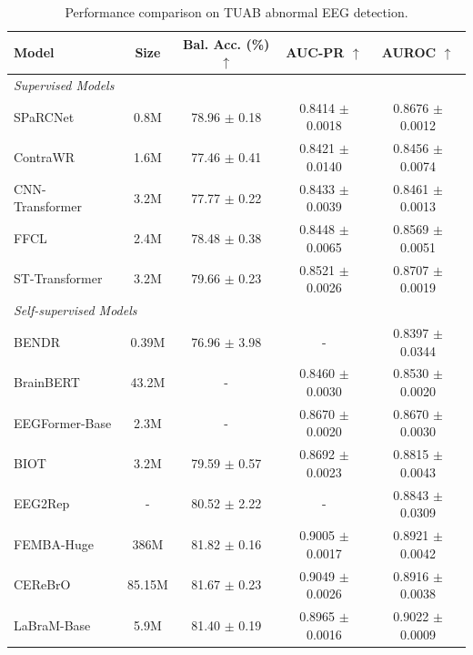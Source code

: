 \begin{table}[htbp!]
    \centering
    \caption{Performance comparison on TUAB abnormal EEG detection.}
    \label{tab:results_tuab}
    
    \setlength{\tabcolsep}{6pt} %
    \small
    \begin{tabular}{@{}lcccc@{}}
        \toprule
        \textbf{Model} & \textbf{Size} & \textbf{Bal. Acc. (\%)} $\uparrow$ & \textbf{AUC-PR} $\uparrow$ & \textbf{AUROC} $\uparrow$ \\
        \midrule
        \multicolumn{5}{l}{\textit{Supervised Models}} \\    SPaRCNet~\cite{jing2023development} & 0.8M & 78.96 $\pm$ 0.18 & 0.8414 $\pm$ 0.0018 & 0.8676 $\pm$ 0.0012 \\
        ContraWR~\cite{yang2021self} & 1.6M & 77.46 $\pm$ 0.41 & 0.8421 $\pm$ 0.0140 & 0.8456 $\pm$ 0.0074 \\
        CNN-Transformer~\cite{peh2022transformer} & 3.2M & 77.77 $\pm$ 0.22 & 0.8433 $\pm$ 0.0039 & 0.8461 $\pm$ 0.0013 \\
        FFCL~\cite{li2022motor} & 2.4M & 78.48 $\pm$ 0.38 & 0.8448 $\pm$ 0.0065 & 0.8569 $\pm$ 0.0051 \\
        ST-Transformer~\cite{song2021transformer} & 3.2M & 79.66 $\pm$ 0.23 & 0.8521 $\pm$ 0.0026 & 0.8707 $\pm$ 0.0019 \\
        \midrule
        \multicolumn{5}{l}{\textit{Self-supervised Models}} \\
        BENDR \citep{kostas2021bendr} & 0.39M & 76.96 $\pm$ 3.98 & -  & 0.8397 $\pm$ 0.0344 \\
        BrainBERT \citep{wang2023brainbert} & 43.2M & - & 0.8460 $\pm$ 0.0030 & 0.8530 $\pm$ 0.0020 \\
        EEGFormer-Base \citep{chen2024eegformer} & 2.3M & - & 0.8670 $\pm$ 0.0020 & 0.8670 $\pm$ 0.0030 \\
        BIOT \citep{yang2023biot} & 3.2M & 79.59 $\pm$ 0.57 & 0.8692 $\pm$ 0.0023 & 0.8815 $\pm$ 0.0043 \\
    EEG2Rep~\cite{mohammadi2024eeg2rep} & - & 80.52 $\pm$ 2.22 & - & 0.8843 $\pm$ 0.0309 \\
        FEMBA-Huge~\cite{tegon2025femba} & 386M  & 81.82 $\pm$ 0.16 & 0.9005 $\pm$ 0.0017 & 0.8921 $\pm$ 0.0042  \\
        CEReBrO~\cite{dimofte2025cerebro} & 85.15M & 81.67 $\pm$ 0.23 & 0.9049 $\pm$ 0.0026 & 0.8916 $\pm$ 0.0038 \\
        LaBraM-Base \citep{jiang2024large} & 5.9M & 81.40 $\pm$ 0.19 & 0.8965 $\pm$ 0.0016 & 0.9022 $\pm$ 0.0009 \\

\end{tabular}
\end{table}

